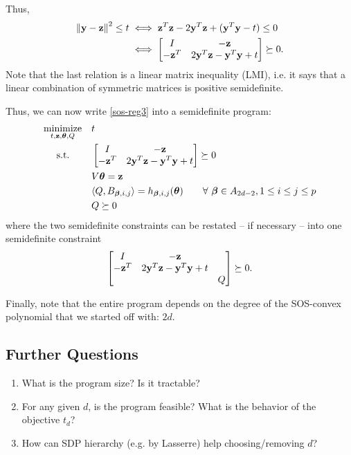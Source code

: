 \documentclass[11pt]{article}
\begin{document}
Thus,
\begin{align*}
\left\lVert {\bf y}-{\bf z} \right\rVert^2 \leq t &\iff {\bf z}^T{\bf z} - 2{\bf y}^T{\bf z} + ({\bf y}^T{\bf y} - t) \leq 0 \\
&\iff \begin{bmatrix} I & -{\bf z} \\ -{\bf z}^T & 2{\bf y}^T{\bf z} - {\bf y}^T{\bf y} + t \end{bmatrix} \succeq 0.
\end{align*}
Note that the last relation is a linear matrix inequality (LMI), i.e. it says that a linear combination of symmetric matrices is positive semidefinite. 

Thus, we can now write \eqref{sos-reg3} into a semidefinite program:
\begin{equation}\label{sos-reg4}
\begin{aligned}
& \underset{t, {\bf z}, {\boldsymbol\theta}, Q}{\text{minimize}}
& & t \\
& \text{\quad\ s.t.}
& & \begin{bmatrix} I & -{\bf z} \\ -{\bf z}^T & 2{\bf y}^T{\bf z} - {\bf y}^T{\bf y} + t \end{bmatrix} \succeq 0 \\
& & & V{\boldsymbol\theta} = {\bf z} \\
& & & \langle{Q, B_{{\boldsymbol\beta}, i, j}} \rangle = h_{{\boldsymbol\beta}, i, j}({\boldsymbol\theta}) \qquad \forall\ {\boldsymbol\beta} \in A_{2d - 2}, 1 \le i \le j \le p \\
& & & Q \succeq 0 
\end{aligned}
\end{equation}
where the two semidefinite constraints can be restated -- if necessary -- into one semidefinite constraint
\[
\begin{bmatrix} I & -{\bf z} &  \\ -{\bf z}^T & 2{\bf y}^T{\bf z} - {\bf y}^T{\bf y} + t & \\ & & Q \end{bmatrix} \succeq 0.
\]

Finally, note that the entire program depends on the degree of the SOS-convex polynomial that we started off with: $2d$. 

\subsection*{Further Questions}

\begin{enumerate}
\item What is the program size? Is it tractable?
\item For any given $d$, is the program feasible? What is the behavior of the objective $t_d$?
\item How can SDP hierarchy (e.g. by Lasserre) help choosing/removing $d$?
\end{enumerate}
\end{document}
